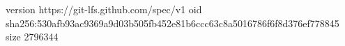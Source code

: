 version https://git-lfs.github.com/spec/v1
oid sha256:530afb93ac9369a9d03b505fb452e81b6ccc63c8a5016786f6f8d376ef778845
size 2796344
